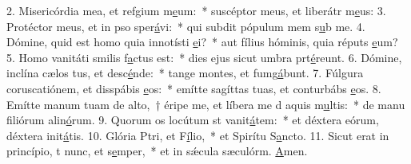 2. Misericórdia mea, et refgium m\uline{e}um:~* suscéptor meus, et liberátr m\uline{e}us:
3. Protéctor meus, et in pso sper\uline{á}vi:~* qui subdit pópulum mem s\uline{u}b me.
4. Dómine, quid est homo quia innotísti \uline{e}i?~* aut fílius hóminis, quia réputs \uline{e}um?
5. Homo vanitáti smilis f\uline{a}ctus est:~* dies ejus sicut umbra prt\uline{é}reunt.
6. Dómine, inclína cælos tus, et desc\uline{é}nde:~* tange montes, et fumg\uline{á}bunt.
7. Fúlgura coruscatiónem, et disspábis \uline{e}os:~* emítte sagíttas tuas, et conturbábs \uline{e}os.
8. Emítte manum tuam de alto,~† éripe me, et líbera me d aquis m\uline{u}ltis:~* de manu filiórum alin\uline{ó}rum.
9. Quorum os locútum st vanit\uline{á}tem:~* et déxtera eórum, déxtera init\uline{á}tis.
10. Glória Ptri, et F\uline{í}lio,~* et Spirítu S\uline{a}ncto.
11. Sicut erat in princípio, t nunc, et s\uline{e}mper,~* et in sǽcula sæculórm. \uline{A}men.

